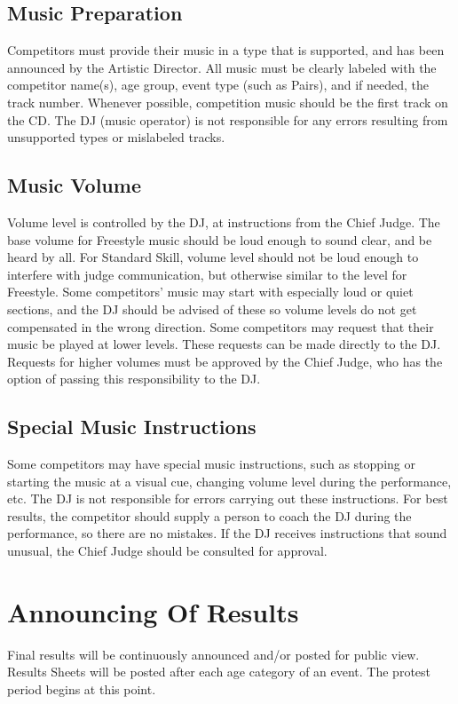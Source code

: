 \subsection{Music Preparation}
Competitors must provide their music in a type that is supported, and has been announced by the Artistic Director.
All music must be clearly labeled with the competitor name(s), age group, event type (such as Pairs), and if needed, the track number.
Whenever possible, competition music should be the first track on the CD.
The DJ (music operator) is not responsible for any errors resulting from unsupported types or mislabeled tracks.

\subsection{Music Volume}
Volume level is controlled by the DJ, at instructions from the Chief Judge.
The base volume for Freestyle music should be loud enough to sound clear, and be heard by all.
For Standard Skill, volume level should not be loud enough to interfere with judge communication, but otherwise similar to the level for Freestyle.
Some competitors' music may start with especially loud or quiet sections, and the DJ should be advised of these so volume levels do not get compensated in the wrong direction.
Some competitors may request that their music be played at lower levels.
These requests can be made directly to the DJ.
Requests for higher volumes must be approved by the Chief Judge, who has the option of passing this responsibility to the DJ.

\subsection{Special Music Instructions}
Some competitors may have special music instructions, such as stopping or starting the music at a visual cue, changing volume level during the performance, etc.
The DJ is not responsible for errors carrying out these instructions.
For best results, the competitor should supply a person to coach the DJ during the performance, so there are no mistakes.
If the DJ receives instructions that sound unusual, the Chief Judge should be consulted for approval.

\section{Announcing Of Results}
Final results will be continuously announced and/or posted for public view.
Results Sheets will be posted after each age category of an event.
The protest period begins at this point.

